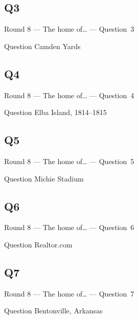 \documentclass[11pt]{beamer}
\begin{document}
\subsection*{Q3}
\begin{frame}[t]{Round 8 --- The home of\ldots{} --- \mbox{Question 3}}
    \vspace{-0.5em}
    \begin{block}{Question}
        Camden Yards
    \end{block}
\end{frame}
\subsection*{Q4}
\begin{frame}[t]{Round 8 --- The home of\ldots{} --- \mbox{Question 4}}
    \vspace{-0.5em}
    \begin{block}{Question}
        Elba Island, 1814--1815
    \end{block}
\end{frame}
\subsection*{Q5}
\begin{frame}[t]{Round 8 --- The home of\ldots{} --- \mbox{Question 5}}
    \vspace{-0.5em}
    \begin{block}{Question}
        Michie Stadium
    \end{block}
\end{frame}
\subsection*{Q6}
\begin{frame}[t]{Round 8 --- The home of\ldots{} --- \mbox{Question 6}}
    \vspace{-0.5em}
    \begin{block}{Question}
        Realtor.com
    \end{block}
\end{frame}
\subsection*{Q7}
\begin{frame}[t]{Round 8 --- The home of\ldots{} --- \mbox{Question 7}}
    \vspace{-0.5em}
    \begin{block}{Question}
        Bentonville, Arkansas
    \end{block}
\end{frame}
\end{document}
